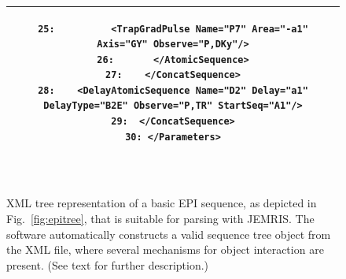 \documentclass[journal,onecolumn,12pt]{IEEEtran}
\begin{document}
\begin{figure}[bht]
\begin{center}
\begin{tabular}{|c|}
\begin{minipage}[h]{1.95\columnwidth}
{\begin{verbatim}
25:          <TrapGradPulse Name="P7" Area="-a1" Axis="GY" Observe="P,DKy"/>
26:       </AtomicSequence>
27:    </ConcatSequence>
28:    <DelayAtomicSequence Name="D2" Delay="a1" DelayType="B2E" Observe="P,TR" StartSeq="A1"/>
29:  </ConcatSequence>
30: </Parameters>
  \end{verbatim}}
  \end{minipage}
  \ \\
  \hline
 \end{tabular}
  \end{center}
  \caption{ XML tree representation of a basic EPI sequence, as depicted in Fig.~\ref{fig:epitree}, that is suitable for
    parsing with JEMRIS. The software automatically constructs a valid sequence tree object from the XML file, where
    several mechanisms for object interaction are present. (See text for further description.)\label{fig:epixml}}
\end{figure}
\end{document}
